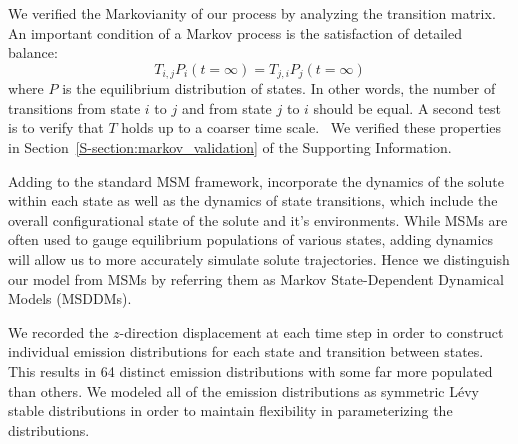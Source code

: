 \documentclass{article}
\begin{document}
  We verified the Markovianity of our process by analyzing the transition matrix. An 
  important condition of a Markov process is the satisfaction of detailed balance:
  \begin{equation}
  T_{i,j}P_i(t=\infty) = T_{j,i}P_j(t=\infty)
  \end{equation}
  where $P$ is the equilibrium distribution of states. In other words, the number of
  transitions from state $i$ to $j$ and from state $j$ to $i$ should be equal. A second
  test is to verify that $T$ holds up to a coarser time scale.~\cite{swope_describing_2004}
  We verified these properties in Section~\ref{S-section:markov_validation} of the 
  Supporting Information.
  
  
  Adding to the standard MSM framework, 
  incorporate
  the dynamics of the solute
  within 
  each state as well as the dynamics of state transitions, which include the overall configurational state of the solute and it's environments. 
  While MSMs are often used to 
  gauge equilibrium populations of various states, adding 
  dynamics will allow us to  %
  more accurately simulate solute trajectories. Hence we distinguish our model from 
  MSMs by referring them as Markov State-Dependent Dynamical Models (MSDDMs). 
  
  We recorded the $z$-direction displacement at each time step in order to construct 
  individual emission distributions for each state and transition between states. 
  This results in 64 distinct emission distributions with some far more populated than
  others. We modeled all of the emission distributions as symmetric L\'evy stable 
  distributions in order to maintain flexibility in parameterizing the distributions.
  
\end{document}
